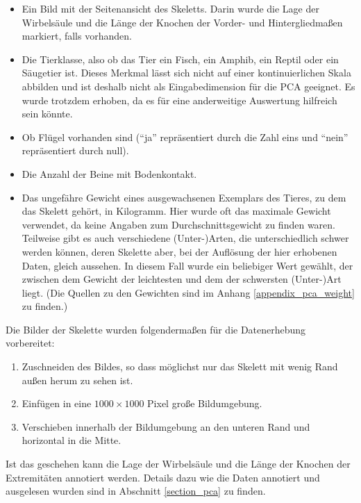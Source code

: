  \begin{itemize}
  \item Ein Bild mit der Seitenansicht des Skeletts.
  Darin wurde die Lage der Wirbelsäule und die Länge der Knochen der Vorder- und Hintergliedmaßen markiert, falls vorhanden.
  
  \item Die Tierklasse, also ob das Tier ein Fisch, ein Amphib, ein Reptil oder ein Säugetier ist. Dieses Merkmal lässt sich nicht auf einer kontinuierlichen Skala abbilden und ist deshalb nicht als Eingabedimension für die PCA geeignet. Es wurde trotzdem erhoben, da es für eine anderweitige Auswertung hilfreich sein könnte.
  
  \item Ob Flügel vorhanden sind ("`ja"' repräsentiert durch die Zahl eins und "`nein"' repräsentiert durch null).
  
  \item Die Anzahl der Beine mit Bodenkontakt.
  
  \item Das ungefähre Gewicht eines ausgewachsenen Exemplars des Tieres, zu dem das Skelett gehört, in Kilogramm. Hier wurde oft das maximale Gewicht verwendet, da keine Angaben zum Durchschnittsgewicht zu finden waren. Teilweise gibt es auch verschiedene (Unter-)Arten, die unterschiedlich schwer werden können, deren Skelette aber, bei der Auflösung der hier erhobenen Daten, gleich aussehen. In diesem Fall wurde ein beliebiger Wert gewählt, der zwischen dem Gewicht der leichtesten und dem der schwersten (Unter-)Art liegt. (Die Quellen zu den Gewichten sind im Anhang \ref{appendix_pca_weight} zu finden.)
 \end{itemize}

 Die Bilder der Skelette wurden folgendermaßen für die Datenerhebung vorbereitet:
 
 \begin{enumerate}
  \item Zuschneiden des Bildes, so dass möglichst nur das Skelett mit wenig Rand außen herum zu sehen ist.
  \item Einfügen in eine $1000 \times 1000$ Pixel große Bildumgebung.
  \item Verschieben innerhalb der Bildumgebung an den unteren Rand und horizontal in die Mitte.
 \end{enumerate}

 Ist das geschehen kann die Lage der Wirbelsäule und die Länge der Knochen der Extremitäten annotiert werden. Details dazu wie die Daten annotiert und ausgelesen wurden sind in Abschnitt \ref{section_pca} zu finden.
 
